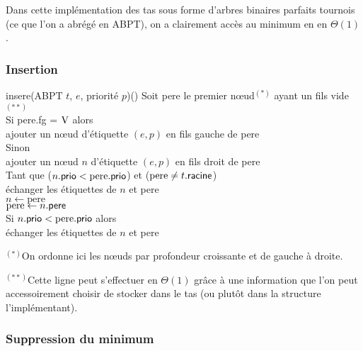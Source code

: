 			Dans cette implémentation des tas sous forme d'arbres binaires parfaits tournois (ce que l'on a abrégé en ABPT), on a clairement accès au minimum en en \(\Theta(1)\).
			
		\subsubsection{Insertion}
		
			\begin{pscode}{insere}{(ABPT \(t\),  \(e\), priorité \(p\))}{()}{}
				Soit pere le premier n\oe ud$^{(*)}$ ayant un fils vide$^{(**)}$ \\
				Si pere.\textsf{fg} = \(\mathrm{V}\) alors \\ \Indp
					ajouter un n\oe ud d'étiquette \((e,p)\) en fils gauche de pere \\ \Indm
				Sinon  \\ \Indp
					ajouter un n\oe ud \(n\) d'étiquette \((e,p)\) en fils droit de pere \\ \Indm
				Tant que (\(n.\text{\textsf{prio}} < \text{pere}.\text{\textsf{prio}}\)) et (\(\text{pere} \neq t.\text{\textsf{racine}}\)) \\ \Indp
					échanger les étiquettes de \(n\) et pere \\
					\(n \gets \text{pere}\) \\
					\(\text{pere} \gets n.\text{\textsf{pere}}\) \\ \Indm
				Si \(n.\text{\textsf{prio}} < \text{pere}.\text{\textsf{prio}}\) alors \\ \Indp
					échanger les étiquettes de \(n\) et pere
			\end{pscode}
			
			\begin{Remarque}
				$^{(*)}$On ordonne ici les n\oe uds par profondeur croissante et de gauche à droite.
			\end{Remarque}
			
			\begin{Remarque}
				$^{(**)}$Cette ligne peut s'effectuer en \(\Theta(1)\) grâce à une information que l'on peut accessoirement choisir de stocker dans le tas (ou plutôt dans la structure l'implémentant).
			\end{Remarque}
		
		\subsubsection{Suppression du minimum}
		

